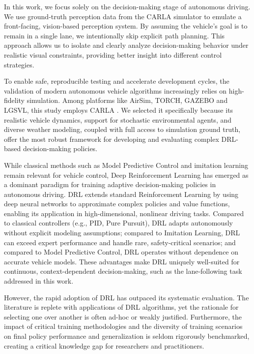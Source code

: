 \documentclass[]{interact}
\begin{document}
In this work, we focus solely on the decision-making stage of autonomous driving. We use ground-truth perception data from the CARLA simulator to emulate a front-facing, vision-based perception system. By assuming the vehicle's goal is to remain in a single lane, we intentionally skip explicit path planning. This approach allows us to isolate and clearly analyze decision-making behavior under realistic visual constraints, providing better insight into different control strategies.

To enable safe, reproducible testing and accelerate development cycles, the validation of modern autonomous vehicle algorithms increasingly relies on high-fidelity simulation. Among platforms like AirSim, TORCH, GAZEBO and LGSVL, this study employs CARLA \cite{dosovitskiy2017carla}. We selected it specifically because its realistic vehicle dynamics, support for stochastic environmental agents, and diverse weather modeling, coupled with full access to simulation ground truth, offer the most robust framework for developing and evaluating complex DRL-based decision-making policies.

While classical methods such as Model Predictive Control and imitation learning remain relevant for vehicle control, Deep Reinforcement Learning has emerged as a dominant paradigm for training adaptive decision-making policies in autonomous driving.
DRL extends standard Reinforcement Learning by using deep neural networks to approximate complex policies and value functions, enabling its application in high-dimensional, nonlinear driving tasks. Compared to classical controllers (e.g., PID, Pure Pursuit), DRL adapts autonomously without explicit modeling assumptions; compared to Imitation Learning, DRL can exceed expert performance and handle rare, safety-critical scenarios; and compared to Model Predictive Control, DRL operates without dependence on accurate vehicle models. These advantages make DRL uniquely well-suited for continuous, context-dependent decision-making, such as the lane-following task addressed in this work.

However, the rapid adoption of DRL has outpaced its systematic evaluation. The literature is replete with applications of DRL algorithms, yet the rationale for selecting one over another is often ad-hoc or weakly justified. Furthermore, the impact of critical training methodologies and the diversity of training scenarios on final policy performance and generalization is seldom rigorously benchmarked, creating a critical knowledge gap for researchers and practitioners.
\end{document}
